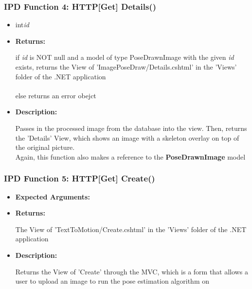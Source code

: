 \documentclass{scrreprt}
\begin{document}
\subsubsection{IPD Function 4: HTTP[Get] Details()}
\begin{itemize}
    \item int\quad\textit{id}

    \item \textbf{Returns:}

    if \textit{id} is NOT null and a model of type PoseDrawnImage with the given \textit{id} exists, returns the View of 'ImagePoseDraw/Details.cshtml' in the 'Views' folder of the .NET application
    \\\\
    else returns an error obejct

    \item \textbf{Description:}

    Passes in the processed image from the database into the view. Then, returns the 'Details' View, which shows an image with a skeleton overlay on top of the original picture.
    \\
    Again, this function also makes a reference to the \textbf{PoseDrawnImage} model
\end{itemize}


\subsubsection{IPD Function 5: HTTP[Get] Create()}
\begin{itemize}
    \item \textbf{Expected Arguments:}
    \item \textbf{Returns:}

    The View of 'TextToMotion/Create.cshtml' in the 'Views' folder of the .NET application

    \item \textbf{Description:}

    Returns the View of 'Create' through the MVC, which is a form that allows a user to upload an image to run the pose estimation algorithm on
\end{itemize}
\end{document}
